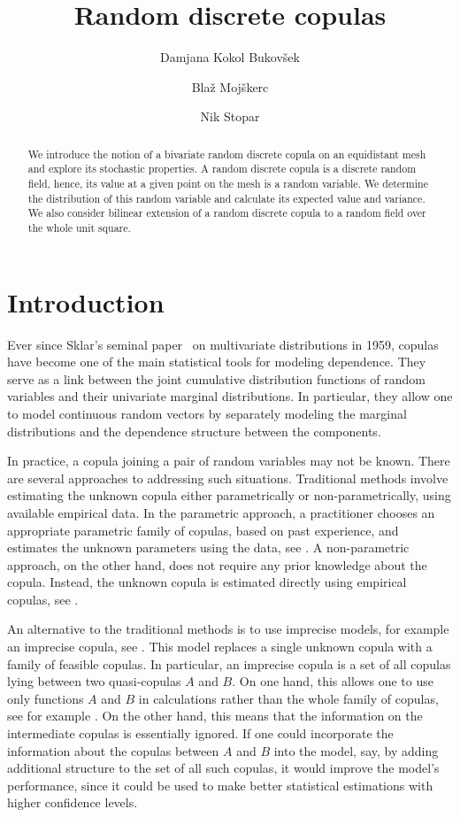\documentclass[12pt,a4paper]{amsart}
\title{Random discrete copulas}
\author[D. Kokol Bukovšek]{Damjana Kokol Bukovšek \orcidlink{0000-0002-0098-6784} }
\author[B. Mojškerc]{Blaž Mojškerc \orcidlink{0000-0001-8096-355X} }
\author[N. Stopar]{Nik Stopar \orcidlink{0000-0002-0004-4957} }
\theoremstyle{definition}
\begin{document}
\begin{abstract}
We introduce the notion of a bivariate random discrete copula on an equidistant mesh and explore its stochastic properties.
A random discrete copula is a discrete random field, hence, its value at a given point on the mesh is a random variable.
We determine the distribution of this random variable and calculate its expected value and variance.
We also consider bilinear extension of a random discrete copula to a random field over the whole unit square. 
\end{abstract}

\maketitle



\section{Introduction}

Ever since Sklar's seminal paper~\cite{Skl59} on multivariate distributions in 1959, copulas have become one of the main statistical tools for modeling dependence. They serve as a link between the joint cumulative distribution functions of random variables and their univariate marginal distributions. 
In particular, they allow one to model continuous random vectors by separately modeling the marginal distributions and the dependence structure between the components.

In practice, a copula joining a pair of random variables may not be known.  
There are several approaches to addressing such situations. 
Traditional methods involve estimating the unknown copula either parametrically or non-parametrically, using available empirical data. 
In the parametric approach, a practitioner chooses an appropriate parametric family of copulas, based on past experience, and estimates the unknown parameters using the data, see \cite{FreVal98, CraCra08, KimSilSil07}. A non-parametric approach, on the other hand, does not require any prior knowledge about the copula.  Instead, the unknown copula is estimated directly using empirical copulas, see \cite{Deh79, CapFouGen97, GenNesRem14}. 

An alternative to the traditional methods is to use imprecise models, for example an imprecise copula, see \cite{MonMirPelVic15, OmlSto20}. 
This model replaces a single unknown copula with a family of feasible copulas. In particular, an imprecise copula is a set of all copulas lying between two quasi-copulas $A$ and $B$. 
On one hand, this allows one to use only functions $A$ and $B$ in calculations rather than the whole family of copulas, see for example \cite{PiEsGoPu26}. 
On the other hand, this means that the information on the intermediate copulas is essentially ignored.  If one could incorporate the information about the copulas between $A$ and $B$ into the model, say, by adding additional structure to the set of all such copulas, it would improve the model's performance, since it could be used to make better statistical estimations with higher confidence levels.
\end{document}
